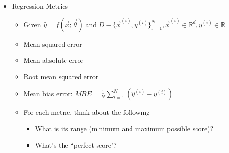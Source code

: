 \documentclass[10pt, oneside]{article}
\newcommand{\R}{\mathbb{R}}
\begin{document}
\begin{itemize}
\begin{itemize}
\begin{itemize}
        \end{itemize}
        \item Regression Metrics
        \begin{itemize}
            \item Given $\hat y = f(\vec x;\vec \theta)$ and $D-\{\vec x^{(i)}, y^{(i)}\}_{i=1}^N, \vec x^{(i)} \in \R^d, y^{(i)} \in \R$
            \item Mean squared error
            \item Mean absolute error
            \item Root mean squared error
            \item Mean bias error: $MBE = \frac{1}{N} \sum_{i=1} ^N \left(\hat y ^{(i)} - y^{(i)}\right)$
            \item For each metric, think about the following
            \begin{itemize}
                \item What is its range (minimum and maximum possible score)?
                \item What's the ``perfect score"?
            \end{itemize}
        \end{itemize}
    \end{itemize}
\end{itemize}
\end{document}

